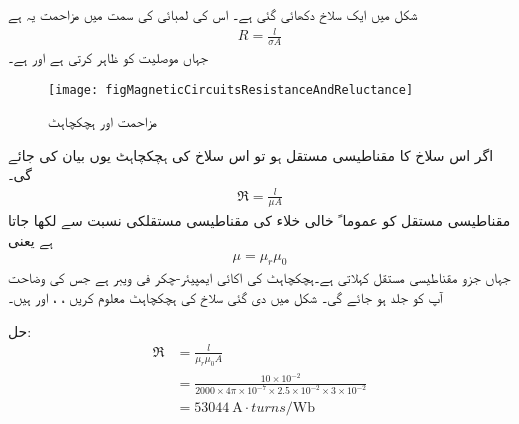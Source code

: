 شکل   میں ایک سلاخ دکھائی گئی ہے۔ اس کی لمبائی کی سمت میں مزاحمت  یہ ہے
\begin{align}
R=\frac{l }{\sigma A}
\end{align}
جہاں   موصلیت کو ظاہر کرتی ہے اور   ہے۔
\begin{figure}
\centering
\texttt{[image: figMagneticCircuitsResistanceAndReluctance]}
\caption{مزاحمت اور ہچکچاہٹ}
\label{شکل_مقناطیسی_دور_مزاحمت_ہچکچاہٹ}
\end{figure}
اگر اس سلاخ کا مقناطیسی مستقل   ہو تو اس سلاخ کی ہچکچاہٹ   یوں بیان کی جائے گی۔
\begin{align}
\Re = \frac{l}{\mu A}
\end{align}
مقناطیسی مستقل  کو عموما ً خالی خلاء کی مقناطیسی مستقلکی  نسبت سے لکھا جاتا ہے یعنی
\begin{align}
\mu=\mu_r \mu_0
\end{align}
جہاں  جزو مقناطیسی مستقل  کہلاتی ہے۔ہچکچاہٹ کی اکائی ایمپیئر-چکر فی ویبر  ہے جس کی وضاحت آپ کو جلد ہو جائے گی۔
%
شکل  میں دی گئی سلاخ کی ہچکچاہٹ معلوم کریں
، ،  اور  ہیں۔

حل:
\begin{align*}
\Re& = \frac{l}{\mu_r \mu_0 A}\\
&=\frac{10\times 10^{-2}}{2000 \times 4 \pi \times 10^{-7} \times 2.5 \times 10^{-2} \times 3 \times 10^{-2}}\\
&=\SI{53044}{\ampere \cdot turns \per \weber}
\end{align*}

